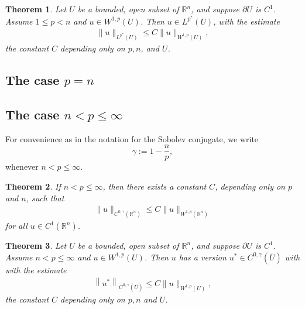 \documentclass[11pt,a4paper]{report}
\newtheorem{theorem}{Theorem}[section]
\theoremstyle{definition}
\begin{document}
\begin{theorem}  
    Let $U$ be a bounded, open subset of $\mathbb{R}^n$, and suppose $\partial U$ is $C^1$. 
    Assume $1 \leq p < n$ and $u \in W^{1, p}(U)$. 
    Then $u \in L^{p^*}(U)$, with the estimate
    \begin{align*}
    \|u\|_{L^{p^*}(U)} \leq C\|u\|_{W^{1, p}(U)},
    \end{align*}
    the constant $C$ depending only on $p, n$, and $U$.
\end{theorem}

\subsection{The case $p=n$}

\subsection{The case $n < p \leq \infty$}

For convenience as in the notation for the Sobolev conjugate, we write 
\begin{equation*} 
    \gamma:=1- \frac{n}{p},
\end{equation*}
whenever $n < p \leq \infty$.

\begin{theorem}
    If $n < p \leq \infty$, then there exists a constant $C$, depending only on $p$ and $n$, such that
    \begin{align*}
    \|u\|_{C^{0, \gamma}\left(\mathbb{R}^n\right)} \leq C\|u\|_{W^{1, p}\left(\mathbb{R}^n\right)}
    \end{align*}
    for all $u \in C^1\left(\mathbb{R}^n\right)$.
\end{theorem}

\begin{theorem}
    Let $U$ be a bounded, open subset of $\mathbb{R}^n$, and suppose $\partial U$ is $C^1$. Assume $n < p \leq \infty$ and $u \in W^{1, p}(U)$. 
    Then $u$ has a version $u^{\ast} \in C^{0, \gamma}(\overline{U})$ with with the estimate
    \begin{align*}
        \left\|u^*\right\|_{C^{0, \gamma}(\bar{U})} \leq C\|u\|_{W^{1, p}(U)},
    \end{align*}
    the constant $C$ depending only on $p, n$ and $U$.
\end{theorem}
\end{document}
